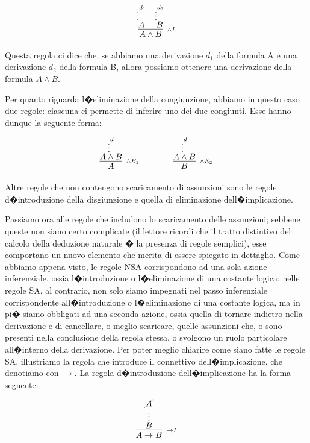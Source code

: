 \documentclass[a4paper,12pt]{aphex}
\begin{document}
$$\infer[_{\wedge I}]{A\wedge B}{\deduce{A}{\vdots^{d_{1}}}{} & \deduce{B}{\vdots^{d_{2}}}{}}$$
                          
                                                         

\noindent Questa regola ci dice che, se abbiamo una derivazione $d_{1}$  della formula A e una derivazione $d_{2}$ della formula B, allora possiamo ottenere una derivazione della formula $A\wedge B$.  

Per quanto riguarda l�eliminazione della congiunzione, abbiamo in questo caso due regole: ciascuna ci permette di inferire uno dei due congiunti. Esse hanno dunque la seguente forma:


$$\infer[_{\wedge E_{1}}]{A}{\deduce{A\wedge B}{\vdots^{d}}{}}\qquad\qquad\infer[_{\wedge E_{2}}]{B}{\deduce{A\wedge B}{\vdots^{d}}{}}$$

                   
                                           


\noindent Altre regole che non contengono scaricamento di assunzioni sono le regole d�introduzione della disgiunzione e quella di eliminazione dell�implicazione. 

Passiamo ora alle regole che includono lo scaricamento delle assunzioni; sebbene queste non siano certo complicate (il lettore ricordi che il tratto distintivo del calcolo della deduzione naturale � la presenza di  regole semplici), esse comportano un nuovo elemento che merita di essere spiegato in dettaglio. Come abbiamo appena visto, le regole NSA corrispondono ad una sola azione inferenziale, ossia l�introduzione o l�eliminazione di una costante logica; nelle regole SA, al contrario, non solo siamo impegnati nel passo inferenziale corrispondente all�introduzione o l�eliminazione di una costante logica, ma in pi� siamo obbligati ad una seconda azione, ossia quella di tornare indietro  nella derivazione e  di cancellare, o meglio scaricare, quelle assunzioni che, o sono presenti nella conclusione della regola stessa, o svolgono un ruolo particolare all�interno della derivazione. 
Per poter meglio chiarire come siano fatte le regole SA, illustriamo la regola che introduce il connettivo dell�implicazione, che denotiamo con $\rightarrow$.  La regola d�introduzione dell�implicazione ha la forma seguente:


$$\infer[_{\rightarrow I}]{A\rightarrow B}{\deduce{B}{\deduce{\vdots}{\cancel{A}}}}$$
\end{document}
